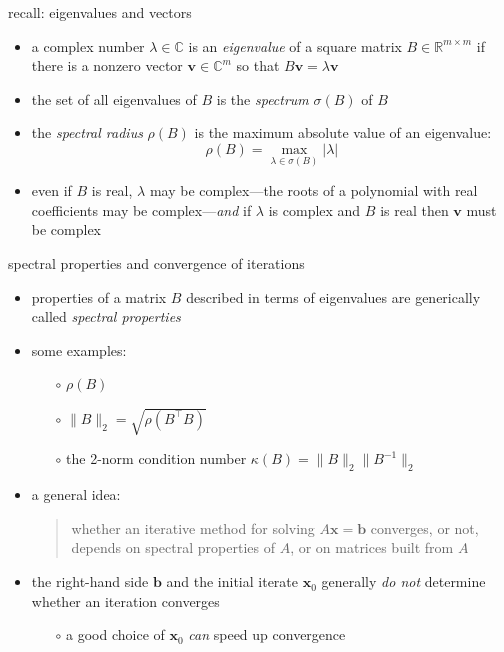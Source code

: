 \documentclass[10pt,hyperref]{beamer}
\newcommand{\bb}{\mathbf{b}}
\newcommand{\bx}{\mathbf{x}}
\newcommand{\bv}{\mathbf{v}}
\newcommand{\CC}{\mathbb{C}}
\newcommand{\RR}{\mathbb{R}}
\begin{document}
\begin{frame}{recall: eigenvalues and vectors}

\begin{itemize}
\item a complex number $\lambda \in \CC$ is an \emph{eigenvalue} of a square matrix $B\in\RR^{m\times m}$ if there is a nonzero vector $\bv\in\CC^m$ so that $B \bv = \lambda \bv$
\item the set of all eigenvalues of $B$ is the \emph{spectrum} $\sigma(B)$ of $B$
\item the \emph{spectral radius} $\rho(B)$ is the maximum absolute value of an eigenvalue:
    $$\rho(B) = \max_{\lambda\in\sigma(B)}  |\lambda|$$
\item even if $B$ is real, $\lambda$ may be complex---the roots of a polynomial with real coefficients may be complex---\emph{and} if $\lambda$ is complex and $B$ is real then $\bv$ must be complex
\end{itemize}
\end{frame}


\begin{frame}{spectral properties and convergence of iterations}

\begin{itemize}
\item properties of a matrix $B$ described in terms of eigenvalues are generically called \emph{spectral properties}
\item some examples:
  \begin{itemize}
  \item[$\circ$] $\rho(B)$
  \item[$\circ$] $\|B\|_2 = \sqrt{\rho(B^\top B)}$
  \item[$\circ$] the 2-norm condition number $\kappa(B)=\|B\|_2 \|B^{-1}\|_2$
  \end{itemize}

\medskip
\item a general idea:
\begin{quote}
whether an iterative method for solving $A\bx = \bb$ converges, or not, depends on spectral properties of $A$, or on matrices built from $A$
\end{quote}

\medskip
\item the right-hand side $\bb$ and the initial iterate $\bx_0$ generally \emph{do not} determine whether an iteration converges
  \begin{itemize}
  \item[$\circ$] a good choice of $\bx_0$ \emph{can} speed up convergence
  \end{itemize}
\end{itemize}
\end{frame}
\end{document}
